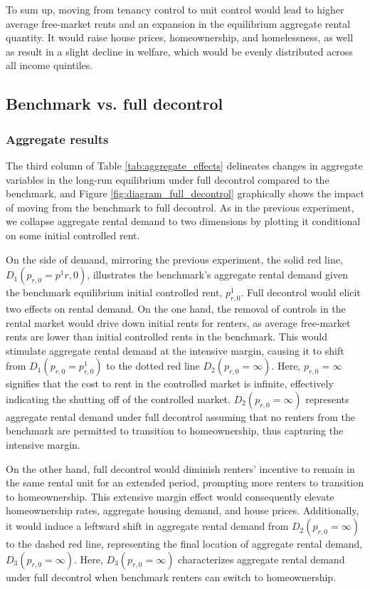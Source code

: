 \documentclass[parskip=full]{article}
\begin{document}
To sum up, moving from tenancy control to unit control would lead to higher average free-market rents and an expansion in the equilibrium aggregate rental quantity. It would raise house prices, homeownership, and homelessness, as well as result in a slight decline in welfare, which would be evenly distributed across all income quintiles. 

\subsection{Benchmark vs. full decontrol}

\subsubsection{Aggregate results}

The third column of Table \ref{tab:aggregate_effects} delineates changes in aggregate variables in the long-run equilibrium under full decontrol compared to the benchmark, and Figure \ref{fig:diagram_full_decontrol} graphically shows the impact of moving from the benchmark to full decontrol. As in the previous experiment, we collapse aggregate rental demand to two dimensions by plotting it conditional on some initial controlled rent.

On the side of demand, mirroring the previous experiment, the solid red line, $D_{1}(p_{r,0}=p^{1}{r,0})$, illustrates the benchmark's aggregate rental demand given the benchmark equilibrium initial controlled rent, $p^{1}_{r,0}$. Full decontrol would elicit two effects on rental demand. On the one hand, the removal of controls in the rental market would drive down initial rents for renters, as average free-market rents are lower than initial controlled rents in the benchmark. This would stimulate aggregate rental demand at the intensive margin, causing it to shift from $D_{1}(p_{r,0}=p^{1}_{r,0})$ to the dotted red line $D_{2}(p_{r,0}=\infty)$. Here, $p_{r,0}=\infty$ signifies that the cost to rent in the controlled market is infinite, effectively indicating the shutting off of the controlled market. $D_{2}(p_{r,0}=\infty)$ represents aggregate rental demand under full decontrol assuming that no renters from the benchmark are permitted to transition to homeownership, thus capturing the intensive margin.

On the other hand, full decontrol would diminish renters' incentive to remain in the same rental unit for an extended period, prompting more renters to transition to homeownership. This extensive margin effect would consequently elevate homeownership rates, aggregate housing demand, and house prices. Additionally, it would induce a leftward shift in aggregate rental demand from $D_{2}(p_{r,0}=\infty)$ to the dashed red line, representing the final location of aggregate rental demand, $D_{3}(p_{r,0}=\infty)$. Here, $D_{3}(p_{r,0}=\infty)$ characterizes aggregate rental demand under full decontrol when benchmark renters can switch to homeownership.
\end{document}
